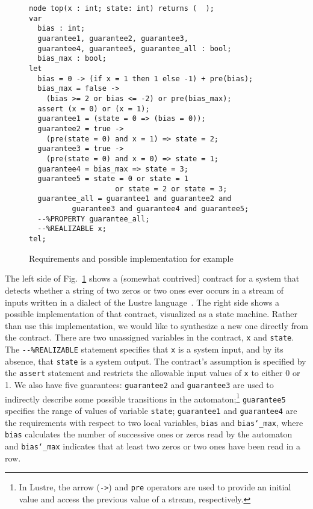 \begin{figure}[t!]
\centering
\begin{minipage}[c]{0.6\textwidth}
\begin{Verbatim}[fontsize=\scriptsize]
node top(x : int; state: int) returns (  );
var
  bias : int;
  guarantee1, guarantee2, guarantee3,
  guarantee4, guarantee5, guarantee_all : bool;
  bias_max : bool;
let
  bias = 0 -> (if x = 1 then 1 else -1) + pre(bias);
  bias_max = false ->
	(bias >= 2 or bias <= -2) or pre(bias_max);
  assert (x = 0) or (x = 1);
  guarantee1 = (state = 0 => (bias = 0));
  guarantee2 = true ->
  	(pre(state = 0) and x = 1) => state = 2;
  guarantee3 = true ->
  	(pre(state = 0) and x = 0) => state = 1;
  guarantee4 = bias_max => state = 3;
  guarantee5 = state = 0 or state = 1
                    or state = 2 or state = 3;
  guarantee_all = guarantee1 and guarantee2 and
          guarantee3 and guarantee4 and guarantee5;
  --%PROPERTY guarantee_all;
  --%REALIZABLE x;
tel;
 \end{Verbatim}
\end{minipage}
\caption{Requirements and possible implementation for example}
\label{fg:example}
\end{figure}

The left side of Fig.~\ref{fg:example} shows a (somewhat contrived) contract for a system that detects whether a string of two zeros or two ones ever occurs in a stream of inputs written in a dialect of the Lustre language~\cite{lustrev6}.  The right side shows a possible implementation of that contract, visualized as a state machine.
%
Rather than use this implementation, we would like to synthesize a new one directly from the contract. There are two unassigned variables in the contract,
\texttt{x} and \texttt{state}.
The \texttt{{-}{-}\%REALIZABLE} statement specifies that \texttt{x} is a system
input, and by its absence, that \texttt{state} is a system output. The contract's 
assumption is specified by the \texttt{assert} statement and restricts the allowable input values of \texttt{x} to either 0 or 1. We also have five guarantees:
\texttt{guarantee2} and \texttt{guarantee3} are used to indirectly
describe some possible transitions in the automaton;\footnote{In Lustre, the
arrow (\texttt{->}) and \texttt{pre} operators are used to provide an initial value and access the previous value of a stream, respectively.} \texttt{guarantee5} specifies the range of
values of variable \texttt{state};
\texttt{guarantee1} and \texttt{guarantee4} are the requirements with respect to
two local variables, \texttt{bias} and \texttt{bias\char`_max}, where
 \texttt{bias} calculates the number of successive ones or
zeros read by the automaton and \texttt{bias\char`_max} indicates that at least two zeros or two ones have been read in a row.

